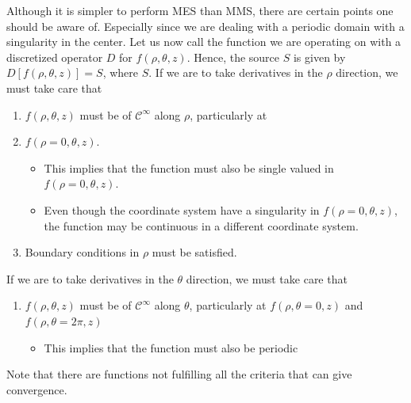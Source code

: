 Although it is simpler to perform MES than MMS, there are certain points one should be aware of.
Especially since we are dealing with a periodic domain with a singularity in the center.
Let us now call the function we are operating on with a discretized operator $D$ for $f(\rho,\theta,z)$.
Hence, the source $S$ is given by $D[f(\rho,\theta,z)]=S$, where $S$.
If we are to take derivatives in the $\rho$ direction, we must take care that
%
\vspace{0.5cm}
\begin{enumerate}
    \item $f(\rho,\theta,z)$ must be of $\mathcal{C}^\infty$ along $\rho$, particularly at \item $f(\rho=0,\theta,z)$.%
    \begin{itemize}[noitemsep,nolistsep]
            \item This implies that the function must also be single valued in $f(\rho=0,\theta,z)$.
            \item Even though the coordinate system have a singularity in $f(\rho=0,\theta,z)$, the function may be continuous in a different coordinate system.
    \end{itemize}
  \item Boundary conditions in $\rho$ must be satisfied.
\end{enumerate}
\vspace{0.5cm}
%
If we are to take derivatives in the $\theta$ direction, we must take care that
%
\vspace{0.5cm}
\begin{enumerate}
    \item $f(\rho,\theta,z)$ must be of $\mathcal{C}^\infty$ along $\theta$, particularly at $f(\rho,\theta=0,z)$ and $f(\rho,\theta=2\pi,z)$%
    \begin{itemize}[noitemsep,nolistsep]
            \item This implies that the function must also be periodic
    \end{itemize}
\end{enumerate}
\vspace{0.5cm}
%
Note that there are functions not fulfilling all the criteria that can give convergence.


